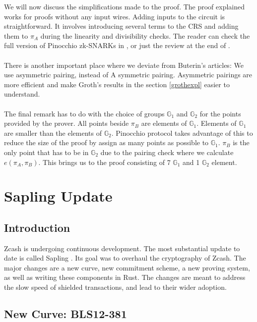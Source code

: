 \noindent We will now discuss the simplifications made to the proof. The proof explained works for proofs without any input wires. Adding inputs to the circuit is straightforward. It involves introducing several terms to the CRS and adding them to $\pi_A$ during the linearity and divisibility checks. The reader can check the full version of Pinocchio zk-SNARKs in \cite{parno2013pinocchio}, or just the review at the end of \cite{ben2014succinct}.\\
\\
There is another important place where we deviate from Buterin's articles: We use asymmetric pairing, instead of A symmetric pairing. Asymmetric pairings are more efficient and make Groth's results in the section \ref{grothexpl} easier to understand.\\
\\
The final remark has to do with the choice of groups $\mathbb{G}_1$ and $\mathbb{G}_2$ for the points provided by the prover. All points beside $\pi_B$ are elements of $\mathbb{G}_1$. Elements of $\mathbb{G}_1$ are smaller than the elements of $\mathbb{G}_2$. Pinocchio protocol takes advantage of this to reduce the size of the proof by assign as many points as possible to $\mathbb{G}_1$. $\pi_B$ is the only point that has to be in $\mathbb{G}_2$ due to the pairing check where we calculate $e(\pi_A, \pi_B)$. This brings us to the proof consisting of 7 $\mathbb{G}_1$ and 1 $\mathbb{G}_2$ element.

\section{Sapling Update}

\subsection{Introduction}
Zcash is undergoing continuous development. The most substantial update to date is called Sapling \cite{zcashsapling}. Its goal was to overhaul the cryptography of Zcash. The major changes are a new curve, new commitment scheme, a new proving system, as well as writing these components in Rust. The changes are meant to address the slow speed of shielded transactions, and lead to their wider adoption.

\subsection{New Curve: BLS12-381}

